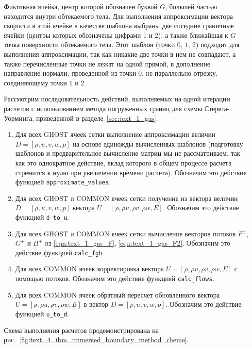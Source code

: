 Фиктивная ячейка, центр которой обозначен буквой $G$, большей частью находится внутри обтекаемого тела.
Для выполнения аппроксимации вектора скорости в этой ячейке в качестве шаблона выбраны две соседние граничные ячейки (центры которых обозначены цифрами $1$ и $2$), а также ближайшая к $G$ точка поверхности обтекаемого тела.
Этот шаблон (точки $0$, $1$, $2$) подходит для выполнения аппроксимации, так как никакие две точки в нем не совпадают, а также перечисленные точки не лежат на одной прямой, в дополнение направление нормали, проведенной из точки $0$, не параллельно отрезку, соединяющему точки $1$ и $2$.


Рассмотрим последовательность действий, выполняемых на одной итерации расчетов с использованием метода погруженных границ для схемы Стерега-Уорминга, приведенной в разделе~\ref{sec:text_1_gas}.

\begin{enumerate}[noitemsep,topsep=0pt,parsep=0pt,partopsep=0pt]
\item Для всех GHOST ячеек сетки выполнение аппроксимации величин $D = [\rho, u, v, w, p]$ на основе единожды вычисленных шаблонов (подготовку шаблонов и предварительное вычисление матриц мы не рассматриваем, так как это однократное действие, вклад которого в общем процессе расчета стремится к нулю при увеличении времени расчета).
Обозначим это действие функцией \texttt{approximate\_values}.
\item Для всех GHOST и COMMON ячеек сетки получение из вектора величин $D = [\rho, u, v, w, p]$ вектора $U = [\rho, \rho u, \rho v, \rho w, E]$.
Обозначим это действие функцией \texttt{d\_to\_u}.
\item Для всех GHOST и COMMON ячеек сетки вычисление векторов потоков $F^{\pm}$, $G^{\pm}$ и $H^{\pm}$ из \eqref{eqn:text_1_gas_F}, \eqref{eqn:text_1_gas_F2}.
Обозначим это действие функцией \texttt{calc\_fgh}.
\item Для всех COMMON ячеек корректировка вектора $U = [\rho, \rho u, \rho v, \rho w, E]$ с помощью потоков.
Обозначим это действие функцией \texttt{calc\_flows}.
\item Для всех COMMON ячеек обратный пересчет обновленного вектора $U = [\rho, \rho u, \rho v, \rho w, E]$ в вектор $D = [\rho, u, v, w, p]$.
Обозначим это действие функцией \texttt{u\_to\_d}.
\end{enumerate}

Схема выполнения расчетов продемонстрирована на рис.~\ref{fig:text_4_ibm_immersed_boundary_method_cheme}.

